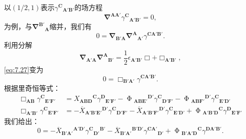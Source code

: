 以$( 1/2,1)$表示$\gamma ^{\boldsymbol{C}}{}_{\boldsymbol{A} '\boldsymbol{B} '}$的场方程
\begin{equation}
	\mathbf{\nabla }^{\boldsymbol{AA} '} \gamma ^{\boldsymbol{C}}{}_{\boldsymbol{A} '\boldsymbol{B} '} =0,
	\label{eq:7.26}
\end{equation}
为例，与$\mathbf{\nabla }^{\boldsymbol{B} '}{}_{\boldsymbol{A}}$缩并，我们有
\begin{equation}
	0=\mathbf{\nabla }_{\boldsymbol{B} '\boldsymbol{A}}\mathbf{\nabla }^{\boldsymbol{A}}{}_{\boldsymbol{A} '} \gamma ^{\boldsymbol{CA} '\boldsymbol{B} '} .
	\label{eq:7.27}
\end{equation}
利用分解
\begin{equation*}
	\mathbf{\nabla }_{\boldsymbol{A} '\boldsymbol{A}}\mathbf{\nabla }^{\boldsymbol{A}}{}_{\boldsymbol{B} '} =\frac{1}{2} \epsilon _{\boldsymbol{A} '\boldsymbol{B} '} \Box +\Box _{\boldsymbol{A} '\boldsymbol{B} '} ,
\end{equation*}
\ref{eq:7.27}变为
\begin{equation*}
	0=\Box _{\boldsymbol{B} '\boldsymbol{A} '} \gamma ^{\boldsymbol{CA} '\boldsymbol{B} '} .
\end{equation*}
根据里奇恒等式：
\begin{equation*}
	\begin{aligned}
		\Box _{\boldsymbol{AB}} \gamma ^{\boldsymbol{C}}{}_{\boldsymbol{E} '\boldsymbol{F} '} & =X{_{\boldsymbol{ABD}}}^{\boldsymbol{C}} \gamma ^{\boldsymbol{D}}{}_{\boldsymbol{E'F} '} -\upPhi {_{\boldsymbol{ABE} '}}^{\boldsymbol{D} '} \gamma ^{\boldsymbol{C}}{}_{\boldsymbol{D} '\boldsymbol{F} '} -\upPhi {_{\boldsymbol{ABF} '}}^{\boldsymbol{D} '} \gamma ^{\boldsymbol{C}}{}_{\boldsymbol{E'D} '}\\
		\Box _{\boldsymbol{A} '\boldsymbol{B} '} \gamma ^{\boldsymbol{C}}{}_{\boldsymbol{E} '\boldsymbol{F} '} & =-\overline{X}{_{\boldsymbol{A} '\boldsymbol{B} '\boldsymbol{E} '}}^{\boldsymbol{D} '} \gamma ^{\boldsymbol{C}}{}_{\boldsymbol{D} '\boldsymbol{F} '} -\overline{X}{_{\boldsymbol{A} '\boldsymbol{B} '\boldsymbol{F} '}}^{\boldsymbol{D} '} \gamma ^{\boldsymbol{C}}{}_{\boldsymbol{E} '\boldsymbol{D} '} +\upPhi {_{\boldsymbol{A'B'D}}}^{\boldsymbol{C}} \gamma ^{\boldsymbol{D}}{}_{\boldsymbol{E'F} '}
	\end{aligned}
\end{equation*}
我们给出：
\begin{equation*}
	0=-\overline{X}{_{\boldsymbol{B} '\boldsymbol{A} '}}^{\boldsymbol{A'D} '} \gamma ^{\boldsymbol{C}}{}{_{\boldsymbol{D} '}}^{\boldsymbol{B} '} -\overline{X}{_{\boldsymbol{B} '\boldsymbol{A} '}}^{\boldsymbol{B'D} '} \gamma ^{\boldsymbol{CA} '}{}_{\boldsymbol{D} '} +\upPhi {_{\boldsymbol{B'A'D}}}^{\boldsymbol{C}} \gamma ^{\boldsymbol{DA} '\boldsymbol{B} '} .
\end{equation*}
